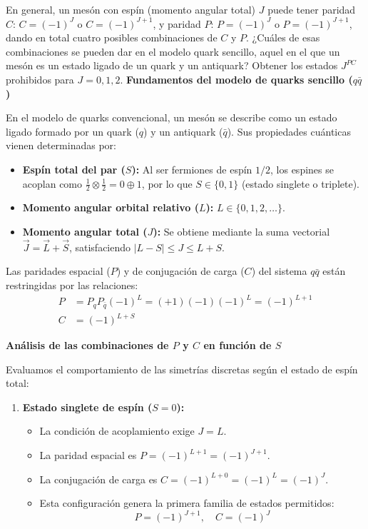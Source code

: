 \newpage
\begin{problema}
En general, un mesón con espín (momento angular total) $J$ puede tener paridad $C$: $C = (-1)^J$ o $C = (-1)^{J+1}$, y paridad $P$: $P = (-1)^J$ o $P = (-1)^{J+1}$, dando en total cuatro posibles combinaciones de $C$ y $P$. ¿Cuáles de esas combinaciones se pueden dar en el modelo quark sencillo, aquel en el que un mesón es un estado ligado de un quark y un antiquark? Obtener los estados $J^{PC}$ prohibidos para $J=0,1,2$.
\tcblower
\textbf{Fundamentos del modelo de quarks sencillo ($q\bar{q}$)}

En el modelo de quarks convencional, un mesón se describe como un estado ligado formado por un quark ($q$) y un antiquark ($\bar{q}$). Sus propiedades cuánticas vienen determinadas por:
\begin{itemize}
    \item \textbf{Espín total del par ($S$):} Al ser fermiones de espín $1/2$, los espines se acoplan como $\frac{1}{2} \otimes \frac{1}{2} = 0 \oplus 1$, por lo que $S \in \{0, 1\}$ (estado singlete o triplete).
    \item \textbf{Momento angular orbital relativo ($L$):} $L \in \{0, 1, 2, \dots\}$.
    \item \textbf{Momento angular total ($J$):} Se obtiene mediante la suma vectorial $\vec{J} = \vec{L} + \vec{S}$, satisfaciendo $|L - S| \le J \le L + S$.
\end{itemize}

Las paridades espacial ($P$) y de conjugación de carga ($C$) del sistema $q\bar{q}$ están restringidas por las relaciones:
\begin{align*}
    P &= P_q P_{\bar{q}} (-1)^L = (+1)(-1)(-1)^L = (-1)^{L+1} \\
    C &= (-1)^{L+S}
\end{align*}

\textbf{Análisis de las combinaciones de $P$ y $C$ en función de $S$}

Evaluamos el comportamiento de las simetrías discretas según el estado de espín total:

\begin{enumerate}[label=\arabic*.]
    \item \textbf{Estado singlete de espín ($S = 0$):}
    \begin{itemize}
        \item La condición de acoplamiento exige $J = L$.
        \item La paridad espacial es $P = (-1)^{L+1} = (-1)^{J+1}$.
        \item La conjugación de carga es $C = (-1)^{L+0} = (-1)^L = (-1)^J$.
        \item Esta configuración genera la primera familia de estados permitidos:
        \begin{equation*}
            P = (-1)^{J+1}, \quad C = (-1)^J
        \end{equation*}
    \end{itemize}


\end{enumerate}
\end{problema}
